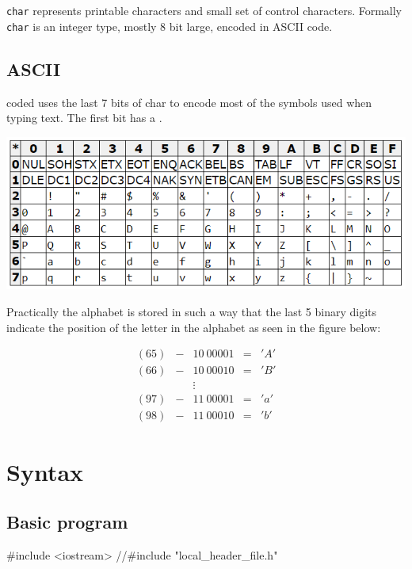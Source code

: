 \documentclass[10pt,a4paper]{scrartcl}
\begin{document}
\begin{multicols*}{2}
\verb+char+ represents printable characters and small set of control characters. Formally \verb+char+ is an integer type, mostly 8 bit large, encoded in ASCII code.

\subsection{ASCII}

 coded uses the last 7 bits of char to encode most of the symbols used when typing text. The first bit has a .

\includegraphics[width=\linewidth]{Pictures/ASCII}

Practically the alphabet is stored in such a way that the last 5 binary digits indicate the position of the letter in the alphabet as seen in the figure below:

\begin{center}
\begin{align*}
(65)&-&10\ 00001&=&'A'\\
(66)&-&10\ 00010&=&'B'\\
&&\vdots&&\\
(97)&-&11\ 00001&=&'a'\\
(98)&-&11\ 00010&=&'b'
\end{align*}
\end{center}



\section{Syntax}

\subsection{Basic program}

\begin{TPCpp}
#include <iostream>
//#include "local_header_file.h"


\end{TPCpp}
\end{multicols*}
\end{document}
